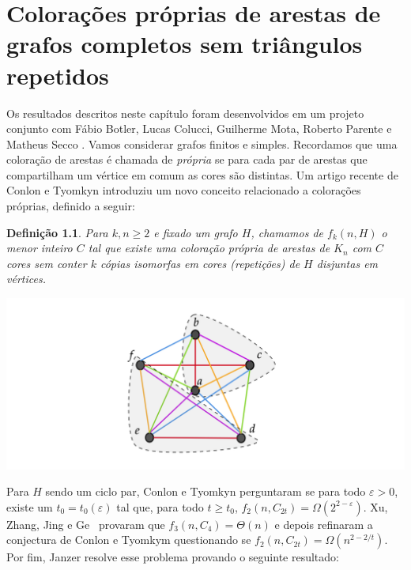 \documentclass[12pt,a4paper]{book}
\let\eps=\varepsilon
\newtheorem{defi}  [teorema] {Definição}
\begin{document}
\chapter[Colorações de grafos completos sem $K_3$ repetidos]{Colorações próprias de arestas de grafos completos sem triângulos repetidos}
\label{cap:triangles} 


Os resultados descritos neste capítulo foram desenvolvidos em um projeto conjunto com Fábio Botler, Lucas Colucci, Guilherme Mota, Roberto Parente e Matheus Secco \cite{botler2022proper}.
Vamos considerar grafos finitos e simples. 
Recordamos que uma coloração de arestas é chamada de \emph{própria} se para cada par de arestas que compartilham um vértice em comum as cores são distintas. Um artigo recente de Conlon e Tyomkyn  \cite{conlontyomkyn} introduziu um novo conceito relacionado a colorações próprias, definido a seguir: 

\begin{defi}\label{def:fkn}
            Para $k,n\geq 2$ e fixado um grafo $H$, chamamos de $f_k(n,H)$ o menor inteiro $C$ tal que existe uma coloração
            própria de arestas de $K_n$ com $C$ cores sem conter $k$ cópias isomorfas em cores (\emph{repetições}) de $H$ disjuntas em vértices. 
\end{defi}

  \begin{center}
			\includegraphics[scale=0.25, keepaspectratio=true]{K6-repet-mark.png}
			\label{fig:K6} 
	\end{center}
	

Para $H$ sendo um ciclo par, Conlon e Tyomkyn \cite{conlontyomkyn} perguntaram se para todo $\eps >0$,
existe um $t_0 = t_0(\eps)$ tal que, para todo 
$t \geq t_0$, $f_2(n, C_{2t}) = \Omega(2^{2-\eps})$.
%
Xu, Zhang, Jing e Ge~\cite{ge2020color} provaram que $f_3(n, C_4) = \Theta(n)$ e depois refinaram a conjectura de Conlon e Tyomkym questionando se
$f_2(n, C_{2t}) = \Omega(n^{2-2/t})$. 
Por fim, Janzer \cite{janzer2023rainbow} resolve esse problema provando o seguinte resultado:
 
\end{document}
